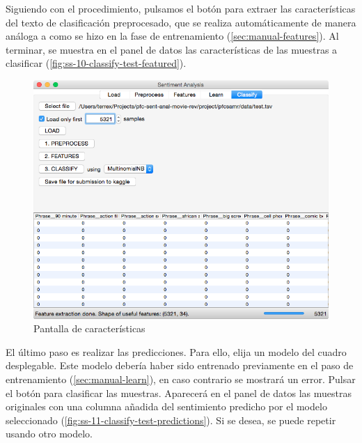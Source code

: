 \newpage
Siguiendo con el procedimiento, pulsamos el botón  para extraer las características del texto de clasificación preprocesado, que se realiza automáticamente de manera análoga a como se hizo en la fase de entrenamiento (\autoref{sec:manual-features}). Al terminar, se muestra en el panel de datos las características de las muestras a clasificar (\autoref{fig:ss-10-classify-test-featured}).

\begin{figure}[H]
\centering
\includegraphics[width=14cm]{ss-10-classify-test-featured}
\caption{Pantalla de características}
\label{fig:ss-10-classify-test-featured}
\end{figure}


\newpage
El último paso es realizar las predicciones. Para ello, elija un modelo del cuadro desplegable. Este modelo debería haber sido entrenado previamente en el paso de entrenamiento (\autoref{sec:manual-learn}), en caso contrario se mostrará un error. Pulsar el botón  para clasificar las muestras. Aparecerá en el panel de datos las muestras originales con una columna añadida del sentimiento predicho por el modelo seleccionado (\autoref{fig:ss-11-classify-test-predictions}). Si se desea, se puede repetir usando otro modelo.

